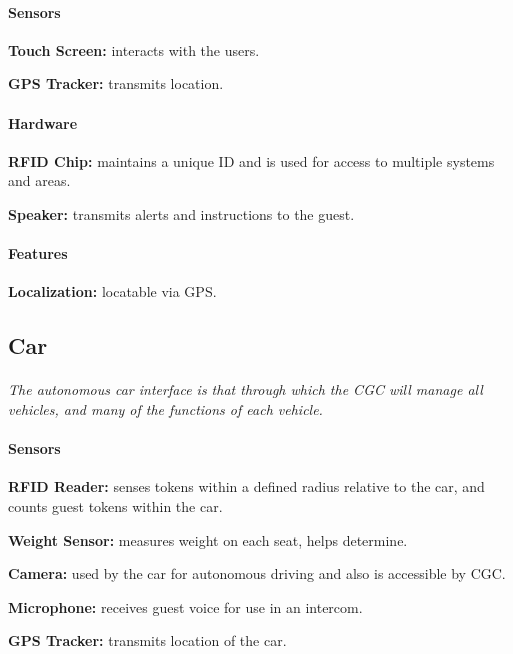 \documentclass[12pt]{article}
\begin{document}
	\paragraph{Sensors}
	\begin{list}{}{}
		\item \textbf{Touch Screen:} interacts with the users. 
		\item \textbf{GPS Tracker:} transmits location. 
	\end{list}
		
	\paragraph{Hardware}
	\begin{list}{}{}
		\item \textbf{RFID Chip:} maintains a unique ID and is used for access to 
		multiple systems and areas.
		\item \textbf{Speaker:} transmits alerts and instructions to the guest.
	\end{list}

	\paragraph{Features}
	\begin{list}{}{}
		\item \textbf{Localization:} locatable via GPS.
	\end{list}

	\subsection{Car}
	\paragraph{} \textit{The autonomous car interface is that through which the CGC will
	manage all vehicles, and many of the functions of each vehicle.}
	
	\paragraph{Sensors}
	\begin{list}{}{}
		\item \textbf{RFID Reader:} senses tokens within a defined radius relative 
		to the car, and counts guest tokens within the car.
		\item \textbf{Weight Sensor:} measures weight on each seat, helps determine. 
		\item \textbf{Camera:} used by the car for autonomous driving and also 
		is accessible by CGC.
		\item \textbf{Microphone:} receives guest voice for use in an intercom.
		\item \textbf{GPS Tracker:} transmits location of the car.
	\end{list}
		
\end{document}
